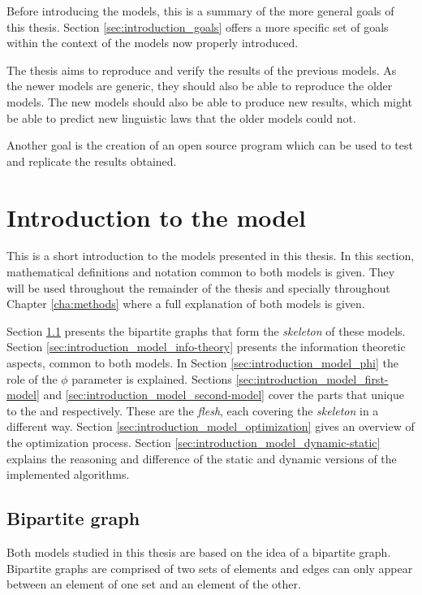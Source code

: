 Before introducing the models, this is a summary of the more general goals of this thesis.
Section \ref{sec:introduction_goals} offers a more specific set of goals within the context of the models now properly introduced.

The thesis aims to reproduce and verify the results of the previous models.
As the newer models are generic, they should also be able to reproduce the older models.
The new models should also be able to produce new results, which might be able to predict new linguistic laws that the older models could not.

Another goal is the creation of an open source program which can be used to test and replicate the results obtained.

\section{Introduction to the model}
\label{sec:introduction_model}

This is a short introduction to the models presented in this thesis.
In this section, mathematical definitions and notation common to both models is given.
They will be used throughout the remainder of the thesis and specially throughout Chapter \ref{cha:methods} where a full explanation of both models is given.

Section \ref{sec:introduction_model_graph} presents the bipartite graphs that form the \emph{skeleton} of these models.
Section \ref{sec:introduction_model_info-theory} presents the information theoretic aspects, common to both models.
In Section \ref{sec:introduction_model_phi} the role of the $\phi$ parameter is explained.
Sections \ref{sec:introduction_model_first-model} and \ref{sec:introduction_model_second-model} cover the parts that unique to the \firstm{} and \secondmodel{} respectively. These are the \emph{flesh}, each covering the \emph{skeleton} in a different way.
Section \ref{sec:introduction_model_optimization} gives an overview of the optimization process.
Section \ref{sec:introduction_model_dynamic-static} explains the reasoning and difference of the static and dynamic versions of the implemented algorithms.

\subsection{Bipartite graph}
\label{sec:introduction_model_graph}

Both models studied in this thesis are based on the idea of a bipartite graph.
Bipartite graphs are comprised of two sets of elements and edges can only appear between an element of one set and an element of the other.

